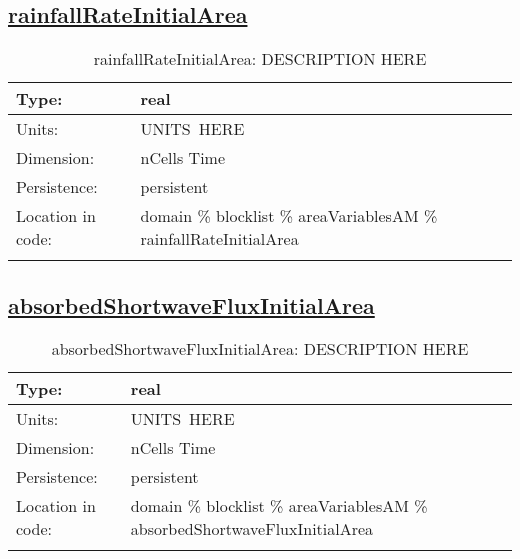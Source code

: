 \subsection[rainfallRateInitialArea]{\hyperref[sec:var_tab_areaVariablesAM]{rainfallRateInitialArea}}
\label{subsec:var_sec_areaVariablesAM_rainfallRateInitialArea}
\begin{center}
\begin{longtable}{| p{2.0in} | p{4.0in} |}
        \hline 
        Type: & real \\
        \hline 
        Units: & \si{UNITS.HERE} \\
        \hline 
        Dimension: & nCells Time \\
        \hline 
        Persistence: & persistent \\
        \hline 
         Location in code: & domain \% blocklist \% areaVariablesAM \% rainfallRateInitialArea \\
         \hline 
    \caption{rainfallRateInitialArea: DESCRIPTION HERE}
\end{longtable}
\end{center}
\subsection[absorbedShortwaveFluxInitialArea]{\hyperref[sec:var_tab_areaVariablesAM]{absorbedShortwaveFluxInitialArea}}
\label{subsec:var_sec_areaVariablesAM_absorbedShortwaveFluxInitialArea}
\begin{center}
\begin{longtable}{| p{2.0in} | p{4.0in} |}
        \hline 
        Type: & real \\
        \hline 
        Units: & \si{UNITS.HERE} \\
        \hline 
        Dimension: & nCells Time \\
        \hline 
        Persistence: & persistent \\
        \hline 
         Location in code: & domain \% blocklist \% areaVariablesAM \% absorbedShortwaveFluxInitialArea \\
         \hline 
    \caption{absorbedShortwaveFluxInitialArea: DESCRIPTION HERE}
\end{longtable}
\end{center}
